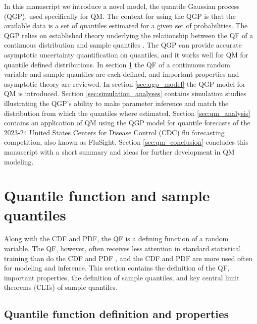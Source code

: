 \documentclass[preprint,12pt,authoryear]{elsarticle}
\begin{document}
In this manuscript we introduce a novel model, the quantile Gaussian process (QGP), used specifically for QM. The context for using the QGP is that the available data is a set of quantiles estimated for a given set of probabilities.
The QGP relies on established theory underlying the relationship between the QF of a continuous distribution and sample quantiles \cite[]{parzen2004quantile, gilchrist2000statistical,hyndman1996sample,walker1968note,cramer1951mathematical}. The QGP can provide accurate asymptotic uncertainty quantification on quantiles, and it works well for QM for quantile defined distributions. 
In section \ref{sec:quant_func} the QF of a continuous random variable and sample quantiles are each defined, and important properties and asymptotic theory are reviewed. In section \ref{sec:qgp_model} the QGP model for QM is introduced. Section \ref{sec:simulation_analyses} contains simulation studies illustrating the QGP's ability to make parameter inference and match the distribution from which the quantiles where estimated. Section \ref{sec:qm_analysis} contains an application of QM using the QGP model for quantile forecasts of the 2023-24 United States Centers for Disease Control (CDC) flu forecasting competition, also known as FluSight. Section \ref{sec:qm_conclusion} concludes this manuscript with a short summary and ideas for further development in QM modeling.




\section{Quantile function and sample quantiles} \label{sec:quant_func}


Along with the CDF and PDF, the QF is a defining function of a random variable. The QF, however, often receives less attention in standard statistical training than do the CDF and PDF \cite[]{parzen2004quantile}, and the CDF and PDF are more used often for modeling and inference.
This section contains the definition of the QF, important properties, the definition of sample quantiles, and key central limit theorems (CLTs) of sample quantiles. 

\subsection{Quantile function definition and properties}
\end{document}
